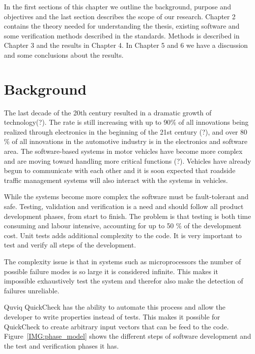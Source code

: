 
In the first sections of this chapter we outline the background, purpose and
objectives and the last section describes the scope of our research. Chapter 2
contains the theory needed for understanding the thesis, existing software and
some verification methods described in the standards. Methods is described in
Chapter 3 and the results in Chapter 4. In Chapter 5 and 6 we have a discussion
and some conclusions about the results.

\section{Background}
The last decade of the 20th century resulted in a dramatic growth of
technology(?). The rate is still increasing with up to 90\% of all innovations
being realized through electronics in the beginning of the 21st century (?), and
over 80 \% of all innovations in the automotive industry is in the electronics
and software area\cite{SAFE:interoperability}. The software-based systems in
motor vehicles have become more complex and are moving toward handling more
critical functions (?). Vehicles have already begun to communicate with each
other \cite{VOLVO:convoys} and it is soon expected that roadside traffic
management systems will also interact with the systems in
vehicles\cite{SURVEY:car_communications}.

While the systems become more complex the software must be fault-tolerant and
safe. Testing, validation and verification is a need and should follow all
product development phases, from start to finish. The problem is that testing is
both time consuming and labour intensive, accounting for up to 50 \% of the
development cost\cite{QUICKCHECK:lightweight}. Unit tests adds additional
complexity to the code. It is very important to test and verify all steps of the
development.

The complexity issue is that in systems such as microprocessors the number of
possible failure modes is so large it is considered
infinite\cite{COURSEBOOK:safety-critical}. This makes it impossible exhaustively
test the system and therefor also make the detection of failures unreliable.

Quviq QuickCheck has the ability to automate this process and allow the
developer to write properties instead of tests. This makes it possible for
QuickCheck to create arbitrary input vectors that can be feed to the
code. Figure~\ref{IMG:phase_model} shows the different steps of software
development and the test and verification phases it has.

